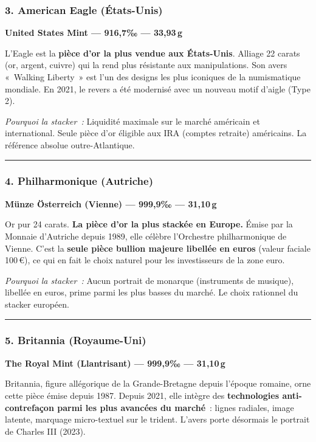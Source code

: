 \documentclass[14pt,a4paper]{extarticle}
\newcommand{\permil}{‰}
\newcommand{\goldsep}{%
  \begin{center}
    \textcolor{gold}{\rule{6cm}{0.4pt}}
  \end{center}
}
\begin{document}
\subsubsection{3. American Eagle (États-Unis)}

\textbf{United States Mint --- 916,7\permil{} --- 33,93\,g}

L'Eagle est la \textbf{pièce d'or la plus vendue aux États-Unis}. Alliage 22 carats (or, argent, cuivre) qui la rend plus résistante aux manipulations. Son avers «~Walking Liberty~» est l'un des designs les plus iconiques de la numismatique mondiale. En 2021, le revers a été modernisé avec un nouveau motif d'aigle (Type 2).

\textit{Pourquoi la stacker~:} Liquidité maximale sur le marché américain et international. Seule pièce d'or éligible aux IRA (comptes retraite) américains. La référence absolue outre-Atlantique.


\goldsep

\subsubsection{4. Philharmonique (Autriche)}

\textbf{Münze Österreich (Vienne) --- 999,9\permil{} --- 31,10\,g}

Or pur 24 carats. \textbf{La pièce d'or la plus stackée en Europe.} Émise par la Monnaie d'Autriche depuis 1989, elle célèbre l'Orchestre philharmonique de Vienne. C'est la \textbf{seule pièce bullion majeure libellée en euros} (valeur faciale 100\,€), ce qui en fait le choix naturel pour les investisseurs de la zone euro.

\textit{Pourquoi la stacker~:} Aucun portrait de monarque (instruments de musique), libellée en euros, prime parmi les plus basses du marché. Le choix rationnel du stacker européen.


\goldsep

\subsubsection{5. Britannia (Royaume-Uni)}

\textbf{The Royal Mint (Llantrisant) --- 999,9\permil{} --- 31,10\,g}

Britannia, figure allégorique de la Grande-Bretagne depuis l'époque romaine, orne cette pièce émise depuis 1987. Depuis 2021, elle intègre des \textbf{technologies anti-contrefaçon parmi les plus avancées du marché}~: lignes radiales, image latente, marquage micro-textuel sur le trident. L'avers porte désormais le portrait de Charles III (2023).
\end{document}

